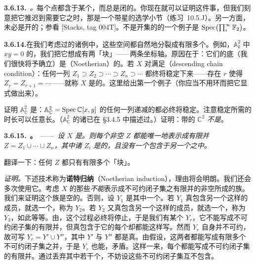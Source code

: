 \textbf{3.6.13.}\ \emph{\trhRemark{}。}\quad 每个点都含于某个\trConnectedComponent{}，而\trConnectedComponent{}总是闭的。你现在就可以证明这件事，但我们刻意把它推迟到需要它之时，那是一个带星的选学小节（练习~10.5.J）。另一方面，\trConnectedComponent{}未必是开的；参看 [Stacks, tag 004T]。\trConnectedComponent{}不是开集的\trAffineScheme{}的一个例子是 $\operatorname{Spec}\bigl(\prod_i^{\infty}\mathbb{F}_2\bigr)$。

\textbf{3.6.14.}\quad 在我们考虑过的诸例中，这些空间都自然地分裂成有限多个\trIrreducibleComponent{}。例如，$\mathbb{A}^2_k$ 中 $xy=0$ 的\trLocus，我们把它想成有两「块」——两条坐标轴。原因在于：它们的底\trTopologicalSpace（我们很快将予确立）是\textbf{\trNoetherian}（Noetherian）的。若\trTopologicalSpace{} $X$ 对\trClosedSubset{}满足\textbf{\trDescendingChainCondition{}}（descending chain condition）：任何一列\trClosedSubset{} $Z_1\supset Z_2\supset\cdots\supset Z_n\supset\cdots$ 都终将稳定下来——存在 $r$ 使得 $Z_r=Z_{r+1}=\cdots$——就称 $X$ 是\trNoetherian{}的。这里给出第一个例子（你应当不用\trNoetherian{}环而把它显式做出来）。

\begin{exercise}\label{ex:a2-noetherian}
证明 $\mathbb{A}^2_{\mathbb{C}}$ 是\trNoetherian{}\trTopologicalSpace：$\mathbb{A}^2_{\mathbb{C}}=\operatorname{Spec}\mathbb{C}[x,y]$ 的任何一列递减的\trClosedSubset{}都必终将稳定。注意稳定所需的时长可以任意长。（$\mathbb{A}^2_{\mathbb{C}}$ 的诸\trClosedSubset{}已在 \S3.4.5 中描述过。）证明：带\trClassicalTopology{}的 $\mathbb{C}^2$ \emph{不是}\trNoetherian{}\trTopologicalSpace。
\end{exercise}

\textbf{3.6.15.}\ \textbf{\trhProposition{}。}\ ——\ \emph{设 $X$ 是\trNoetherian{}\trTopologicalSpace。则每个非空\trClosedSubset{} $Z$ 都能唯一地表示成有限并 $Z=Z_1\cup\cdots\cup Z_n$，其中诸 $Z_i$ 是\trIrreducible{}的\trClosedSubset，且没有一个包含于另一个之中。}

翻译一下：任何\trClosedSubset{} $Z$ 都只有有限多个「块」。

\emph{证明。}\quad 下述技术称为\textbf{诺特归纳}（Noetherian induction），理由将会明朗。我们还会多次使用它。考虑 $X$ 的那些\emph{不能}表示成不可约闭子集之有限并的非空\trClosedSubset{}所成的族。我们来证明这个族是空的。否则，设 $Y_1$ 是其中一个。若 $Y_1$ 真包含另一个这样的成员，就选一个，称为 $Y_2$。若 $Y_2$ 又真包含另一个这样的成员，就选一个，称为 $Y_3$，如此等等。由\trDescendingChainCondition{}，这个过程必终将停止，于是我们有某个 $Y_r$，它不能写成不可约闭子集的有限并，但真包含于它的每个\trClosedSubset{}却都能这样写。然而 $Y_r$ 自身并不可约，故可写 $Y_r=Y'\cup Y''$，其中 $Y'$ 与 $Y''$ 都是真\trClosedSubset。由假设，这两者都能写成有限多个不可约闭子集之并，于是 $Y_r$ 也能，矛盾。这样一来，每个\trClosedSubset{}都能写成不可约闭子集的有限并。通过丢弃其中若干个，不妨设这些不可约闭子集互不包含。

